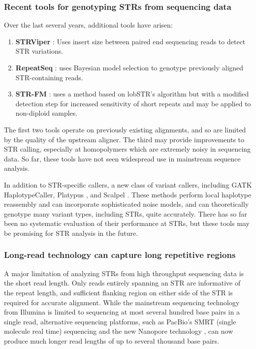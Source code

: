 \subsubsection{Recent tools for genotyping STRs from sequencing data}
Over the last several years, additional tools have arisen:

\begin{enumerate}
\item \textbf{STRViper} \cite{CaoTaskerWilladsenEtAl2014}: Uses insert size between paired end sequencing reads to detect STR variations.
\item \textbf{RepeatSeq} \cite{HighnamFranckMartinEtAl2013}: uses Bayesian model selection to genotype previously aligned STR-containing reads.
\item \textbf{STR-FM} \cite{FungtammasanAnandaHileEtAl2015}: uses a method based on lobSTR's algorithm but with a modified detection step for increased sensitivity of short repeats and may be applied to non-diploid samples.
\end{enumerate}

The first two tools operate on previously existing alignments, and so are limited by the quality of the upstream aligner. The third may provide improvements to STR calling, especially at homopolymers which are extremely noisy in sequencing data. So far, these tools have not seen widespread use in mainstream sequence analysis.

In addition to STR-specific callers, a new class of variant callers, including GATK \cite{McKennaHannaBanksEtAl2010} HaplotypeCaller, Platypus \cite{RimmerPhanMathiesonEtAl2014}, and Scalpel \cite{NarzisiORaweIossifovEtAl2014}. These methods perform local haplotype reassembly and can incorporate sophisticated noise models, and can theoretically genotype many variant types, including STRs, quite accurately. There has so far been no systematic evaluation of their performance at STRs, but these tools may be promising for STR analysis in the future.

\subsubsection{Long-read technology can capture long repetitive regions}
A major limitation of analyzing STRs from high throughput sequencing data is the short read length. Only reads entirely spanning an STR are informative of the repeat length, and sufficient flanking region on either side of the STR is required for accurate alignment. While the mainstream sequencing technology from Illumina is limited to sequencing at most several hundred base pairs in a single read, alternative sequencing platforms, such as PacBio's SMRT (single molecule real time) sequencing \cite{EidFehrGrayEtAl2009} and the new Nanopore technology \cite{ClarkeWuJayasingheEtAl2009}, can now produce much longer read lengths of up to several thousand base pairs.

